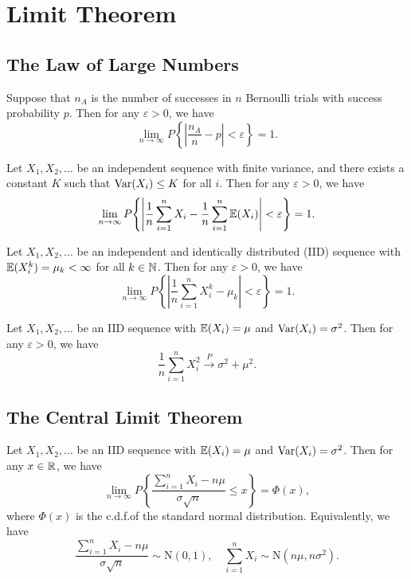\chapter{Limit Theorem}

\section{The Law of Large Numbers}

\begin{theorem}
  Suppose that \(n_A\) is the number of successes in \(n\) Bernoulli trials with success probability \(p\). Then for any \(\varepsilon > 0\), we have
  \[
    \lim_{n \to \infty} P\!\left\{ \left| \frac{n_A}{n} - p \right| < \varepsilon \right\} = 1.
  \]
\end{theorem}

\begin{theorem}
  Let \(X_1, X_2, \ldots\) be an independent sequence with finite variance, and there exists a constant \(K\) such that \(\mathrm{Var}(X_i) \leq K\) for all \(i\). Then for any \(\varepsilon > 0\), we have
  \[
    \lim_{n \to \infty} P\!\left\{ \left| \frac{1}{n} \sum_{i=1}^n X_i - \frac{1}{n} \sum_{i=1}^n \mathbb{E}(X_i) \right| < \varepsilon \right\} = 1.
  \]
\end{theorem}

\begin{theorem}
  Let \(X_1, X_2, \ldots\) be an independent and identically distributed (IID) sequence with \(\mathbb{E}(X_i^k) = \mu_k < \infty\) for all \(k \in \mathbb{N}\). Then for any \(\varepsilon > 0\), we have
  \[
    \lim_{n \to \infty} P\!\left\{ \left| \frac{1}{n} \sum_{i=1}^n X_i^k - \mu_k \right| < \varepsilon \right\} = 1.
  \]
\end{theorem}

\begin{example}
  Let \(X_1, X_2, \ldots\) be an IID sequence with \(\mathbb{E}(X_i) = \mu\) and \(\mathrm{Var}(X_i) = \sigma^2\). Then for any \(\varepsilon > 0\), we have
  \[
    \frac{1}{n} \sum_{i=1}^n X_i^2 \xrightarrow{P} \sigma^2 + \mu^2.
  \]
\end{example}

\section{The Central Limit Theorem}

\begin{theorem}
  Let \(X_1, X_2, \ldots\) be an IID sequence with \(\mathbb{E}(X_i) = \mu\) and \(\mathrm{Var}(X_i) = \sigma^2\). Then for any \(x \in \mathbb{R}\), we have
  \[
    \lim_{n \to \infty} P\!\left\{ \frac{\sum_{i=1}^n X_i - n\mu}{\sigma \sqrt{n}} \leq x \right\} = \Phi(x),
  \]
  where \(\Phi(x)\) is the c.d.f.\@ of the standard normal distribution. Equivalently, we have
  \[
    \frac{\sum_{i=1}^n X_i - n\mu}{\sigma \sqrt{n}} \sim \mathrm{N}(0, 1), \quad \sum_{i=1}^n X_i \sim \mathrm{N}(n\mu, n\sigma^2).
  \]
\end{theorem}

